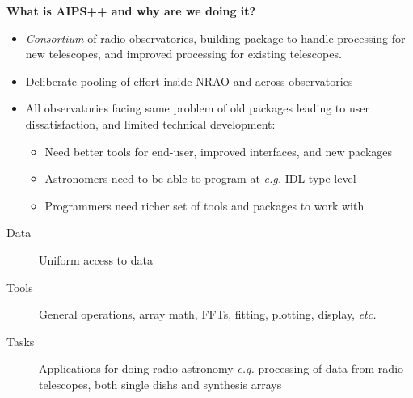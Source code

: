 
%



\newenvironment{slide}[1]{\LARGE\begin{center}{\bf #1}\end{center}}{\newpage}

\begin{slide}{What is AIPS++ and why are we doing it?}
\begin{itemize}
\item {\em Consortium} of radio observatories, building package
to handle processing for new telescopes, and improved processing
for existing telescopes.
\item Deliberate pooling of effort inside NRAO and across
observatories
\item All observatories facing same problem of old packages
leading to user dissatisfaction, and limited technical
development:
\begin{itemize}
\item Need better tools for end-user, improved interfaces,
and new packages
\item Astronomers need to be able to program at {\em e.g.}
IDL-type level
\item Programmers need richer set of tools and packages to
work with
\end{itemize}
\end{itemize}
\begin{description}
\item[Data] Uniform access to data
\item[Tools] General operations, array math, FFTs, fitting, plotting,
display, {\em etc.}
\item[Tasks] Applications for doing radio-astronomy {\em e.g.}
processing of data from radio-telescopes, both single dishs and
synthesis arrays
\end{description}
\end{slide}

